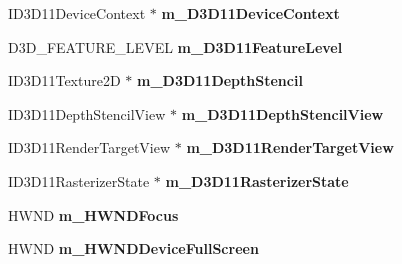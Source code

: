 \begin{DoxyCompactItemize}
\item 
\hypertarget{struct_d_x_u_t_state_1_1_s_t_a_t_e_a3523a70807fc8f5bc949793a4b968ba5}{I\+D3\+D11\+Device\+Context $\ast$ {\bfseries m\+\_\+\+D3\+D11\+Device\+Context}}\label{struct_d_x_u_t_state_1_1_s_t_a_t_e_a3523a70807fc8f5bc949793a4b968ba5}

\item 
\hypertarget{struct_d_x_u_t_state_1_1_s_t_a_t_e_a82654d25136aa13d00f783834f94149a}{D3\+D\+\_\+\+F\+E\+A\+T\+U\+R\+E\+\_\+\+L\+E\+V\+E\+L {\bfseries m\+\_\+\+D3\+D11\+Feature\+Level}}\label{struct_d_x_u_t_state_1_1_s_t_a_t_e_a82654d25136aa13d00f783834f94149a}

\item 
\hypertarget{struct_d_x_u_t_state_1_1_s_t_a_t_e_a131a6bfecee6f80c4e0d12d4f3b0c88b}{I\+D3\+D11\+Texture2\+D $\ast$ {\bfseries m\+\_\+\+D3\+D11\+Depth\+Stencil}}\label{struct_d_x_u_t_state_1_1_s_t_a_t_e_a131a6bfecee6f80c4e0d12d4f3b0c88b}

\item 
\hypertarget{struct_d_x_u_t_state_1_1_s_t_a_t_e_af844053a6b57974703bfccc1bea412e1}{I\+D3\+D11\+Depth\+Stencil\+View $\ast$ {\bfseries m\+\_\+\+D3\+D11\+Depth\+Stencil\+View}}\label{struct_d_x_u_t_state_1_1_s_t_a_t_e_af844053a6b57974703bfccc1bea412e1}

\item 
\hypertarget{struct_d_x_u_t_state_1_1_s_t_a_t_e_ac9229b8e9b22cadfd8713f4c85fcb8e4}{I\+D3\+D11\+Render\+Target\+View $\ast$ {\bfseries m\+\_\+\+D3\+D11\+Render\+Target\+View}}\label{struct_d_x_u_t_state_1_1_s_t_a_t_e_ac9229b8e9b22cadfd8713f4c85fcb8e4}

\item 
\hypertarget{struct_d_x_u_t_state_1_1_s_t_a_t_e_a6a39c3dfdbb928c13048142b387cd7ec}{I\+D3\+D11\+Rasterizer\+State $\ast$ {\bfseries m\+\_\+\+D3\+D11\+Rasterizer\+State}}\label{struct_d_x_u_t_state_1_1_s_t_a_t_e_a6a39c3dfdbb928c13048142b387cd7ec}

\item 
\hypertarget{struct_d_x_u_t_state_1_1_s_t_a_t_e_a582221b39599f423624f4f8460b77e18}{H\+W\+N\+D {\bfseries m\+\_\+\+H\+W\+N\+D\+Focus}}\label{struct_d_x_u_t_state_1_1_s_t_a_t_e_a582221b39599f423624f4f8460b77e18}

\item 
\hypertarget{struct_d_x_u_t_state_1_1_s_t_a_t_e_a62c161bf3ed442d75890eff13050940e}{H\+W\+N\+D {\bfseries m\+\_\+\+H\+W\+N\+D\+Device\+Full\+Screen}}\label{struct_d_x_u_t_state_1_1_s_t_a_t_e_a62c161bf3ed442d75890eff13050940e}


\end{DoxyCompactItemize}
